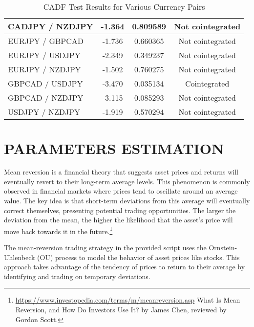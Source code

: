\documentclass{article}
\begin{document}
\begin{table}[h!]
\begin{tabular}{|l|c|c|c|}
        \hline
        CADJPY / NZDJPY & -1.364 & 0.809589 & Not cointegrated \\
        \hline
        EURJPY / GBPCAD & -1.736 & 0.660365 & Not cointegrated \\
        \hline
        EURJPY / USDJPY & -2.349 & 0.349237 & Not cointegrated \\
        \hline
        EURJPY / NZDJPY & -1.502 & 0.760275 & Not cointegrated \\
        \hline
        GBPCAD / USDJPY & -3.470 & 0.035134 & Cointegrated \\
        \hline
        GBPCAD / NZDJPY & -3.115 & 0.085293 & Not cointegrated \\
        \hline
        USDJPY / NZDJPY & -1.919 & 0.570294 & Not cointegrated \\
        \hline
    \end{tabular}
    \caption{CADF Test Results for Various Currency Pairs}
    \label{tab:cadf_results}
\end{table}


\clearpage



















\section{PARAMETERS ESTIMATION}
Mean reversion is a financial theory that suggests asset prices and returns will eventually revert to their long-term average levels. This phenomenon is commonly observed in financial markets where prices tend to oscillate around an average value. The key idea is that short-term deviations from this average will eventually correct themselves, presenting potential trading opportunities. The larger the deviation from the mean, the higher the likelihood that the asset's price will move back towards it in the future.\footnote{\url{https://www.investopedia.com/terms/m/meanreversion.asp} \newline What Is Mean Reversion, and How Do Investors Use It? by James Chen, reviewed by Gordon Scott.}

The mean-reversion trading strategy in the provided script uses the Ornstein-Uhlenbeck (OU) process to model the behavior of asset prices like stocks. This approach takes advantage of the tendency of prices to return to their average by identifying and trading on temporary deviations.
\end{document}
